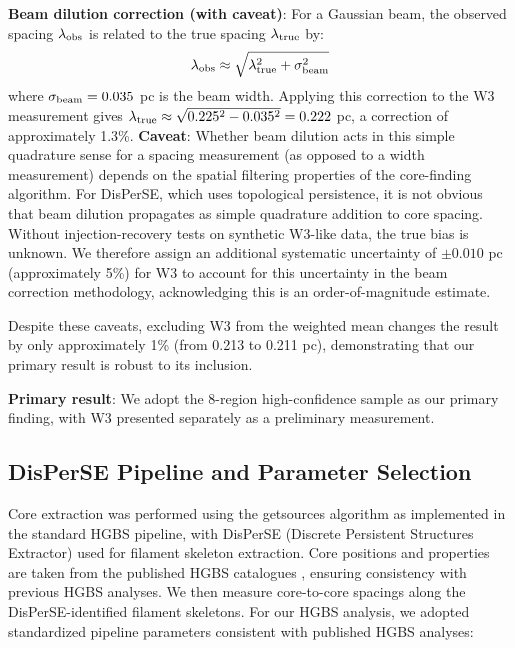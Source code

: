 \documentclass[11pt,a4paper]{article}
\begin{document}
\textbf{Beam dilution correction (with caveat)}: For a Gaussian beam, the observed spacing $\lambda_{\rm obs}$ is related to the true spacing $\lambda_{\rm true}$ by:
\begin{equation}
\lambda_{\rm obs} \approx \sqrt{\lambda_{\rm true}^2 + \sigma_{\rm beam}^2}
\end{equation}
where $\sigma_{\rm beam} = 0.035$ pc is the beam width. Applying this correction to the W3 measurement gives $\lambda_{\rm true} \approx \sqrt{0.225^2 - 0.035^2} = 0.222$ pc, a correction of approximately 1.3\%. \textbf{Caveat}: Whether beam dilution acts in this simple quadrature sense for a spacing measurement (as opposed to a width measurement) depends on the spatial filtering properties of the core-finding algorithm. For DisPerSE, which uses topological persistence, it is not obvious that beam dilution propagates as simple quadrature addition to core spacing. Without injection-recovery tests on synthetic W3-like data, the true bias is unknown. We therefore assign an additional systematic uncertainty of $\pm0.010$ pc (approximately 5\%) for W3 to account for this uncertainty in the beam correction methodology, acknowledging this is an order-of-magnitude estimate.

Despite these caveats, excluding W3 from the weighted mean changes the result by only approximately 1\% (from 0.213 to 0.211 pc), demonstrating that our primary result is robust to its inclusion.

\textbf{Primary result}: We adopt the 8-region high-confidence sample as our primary finding, with W3 presented separately as a preliminary measurement.

\subsection{DisPerSE Pipeline and Parameter Selection}

Core extraction was performed using the getsources algorithm \citep{Men'shchikov2012} as implemented in the standard HGBS pipeline, with DisPerSE (Discrete Persistent Structures Extractor) \citep{Sousbie2011} used for filament skeleton extraction. Core positions and properties are taken from the published HGBS catalogues \citep{Konyves2015, Konyves2020, Andre2016}, ensuring consistency with previous HGBS analyses. We then measure core-to-core spacings along the DisPerSE-identified filament skeletons. For our HGBS analysis, we adopted standardized pipeline parameters consistent with published HGBS analyses:
\end{document}
